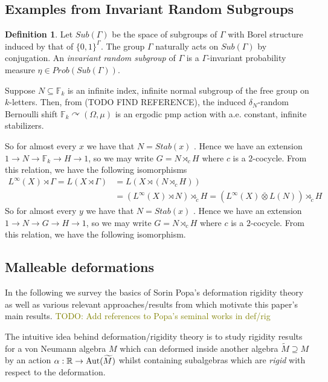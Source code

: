\documentclass[a4paper,11pt]{article}
\numberwithin{equation}{section}
\theoremstyle{definition}
\newtheorem{defn}[thm]{Definition}
\theoremstyle{remark}
\numberwithin{equation}{section}
\def\R{\mathbb{R}}
\newcommand{\Aut}{{\rm Aut}}
\def\sub{\subseteq}
\newcommand*\cls[1]{\overline{#1}}
\numberwithin{equation}{section}
\begin{document}
\subsection{Examples from Invariant Random Subgroups}

\begin{defn} 
    Let $ Sub(\Gamma) $ be the space of subgroups of $ \Gamma $ with Borel structure induced by that of $ \{0,1\}^{\Gamma} $. The group $ \Gamma $ naturally acts on $ Sub(\Gamma) $ by conjugation. An \textit{invariant random subgroup} of $ \Gamma $ is a $ \Gamma $-invariant probability measure $ \eta \in Prob(Sub(\Gamma)) $. 
\end{defn}

Suppose $ N\sub \mathbb{F}_{k} $ is an infinite index, infinite normal subgroup of the free group on $ k $-letters. Then, from (TODO FIND REFERENCE), the induced $ \delta_{N} $-random Bernoulli shift $ \mathbb{F}_k \curvearrowright (\Omega, \mu)$ is an ergodic pmp action with a.e. constant, infinite stabilizers.

So for almost every $ x $ we have that $N= Stab(x) $ . Hence we have an extension $ 1\to N\to \mathbb{F}_{k}\to H \to 1 $, so we may write $ G = N\rtimes_{c} H $ where $ c $ is a $2$-cocycle. From this relation, we have the following isomorphisms
    \begin{align*}
        L^\infty(X)\rtimes \Gamma = L(X\rtimes \Gamma) &= L(X\rtimes(N\rtimes_{c}H)) \\
        &= (L^\infty(X)\rtimes N) \rtimes_{\tilde{c}} H = (L^\infty(X)\cls{\otimes} L(N)) \rtimes_{\tilde{c}} H
    \end{align*}
So for almost every $ y $ we have that $N= Stab(x) $ . Hence we have an extension $ 1\to N\to G\to H \to 1 $, so we may write $ G = N\rtimes_{c} H $ where $ c $ is a $2$-cocycle. From this relation, we have the following isomorphism.



\subsection{Malleable deformations}

In the following we survey the basics of Sorin Popa's deformation rigidity theory as well as various relevant approaches/results from \textcite{dSHH:21} which motivate this paper's main results. \textcolor{olive}{TODO: Add references to Popa's seminal works in def/rig}

The intuitive idea behind deformation/rigidity theory is to study rigidity results for a von Neumann algebra $ M $ which can deformed inside another algebra $ \widetilde{M}\supseteq M $ by an action $ \alpha: \R \to \Aut(\widetilde{M}) $ whilst containing subalgebras which are \textit{rigid} with respect to the deformation.
\end{document}

